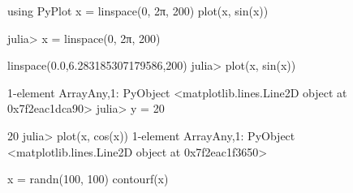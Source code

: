 




\begin{juliacode}using PyPlot
x = linspace(0, 2π, 200)
plot(x, sin(x))
\end{juliacode}









\begin{juliaterm}
julia> x = linspace(0, 2π, 200)

linspace(0.0,6.283185307179586,200)
julia> plot(x, sin(x))

1-element Array{Any,1}:
 PyObject <matplotlib.lines.Line2D object at 0x7f2eac1dca90>
julia> y = 20

20
julia> plot(x, cos(x))
1-element Array{Any,1}:
 PyObject <matplotlib.lines.Line2D object at 0x7f2eac1f3650>
\end{juliaterm}



\begin{juliacode}x = randn(100, 100)
contourf(x)
\end{juliacode}
